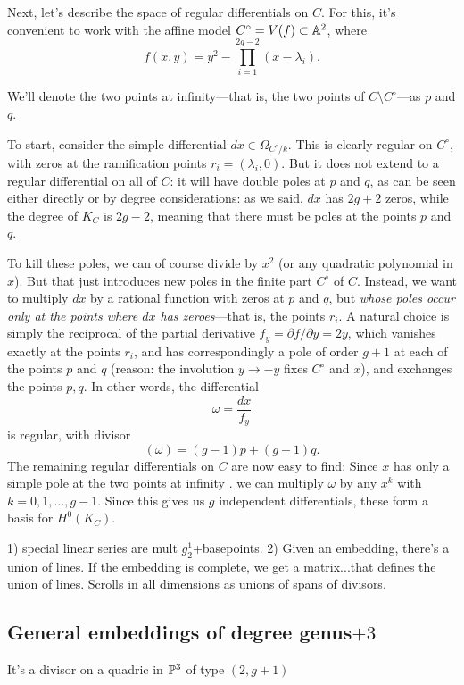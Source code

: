 Next, let's describe the space of regular differentials on $C$. For this, it's convenient to work with the affine model $C^\circ = V(f) \subset \AA^2$, where
$$
f(x,y) = y^2 - \prod_{i=1}^{2g-2} (x - \lambda_i).
$$

We'll denote the two points at infinity---that is, the two points of $C \setminus C^\circ$---as $p$ and $q$.

To start, consider the simple differential $dx\in \Omega_{C^\circ/k}$. This is clearly regular on $C^\circ$, with zeros at the ramification points $r_i = (\lambda_i, 0)$. But it does not extend to a regular differential on all of $C$: it will have double poles at $p$ and $q$, as can be seen either directly or by degree considerations: as we said, $dx$ has $2g+2$ zeros, while the degree of $K_C$ is $2g-2$, meaning that there must be poles at the points $p$ and $q$.

To kill these poles, we can of course divide by $x^2$ (or any quadratic polynomial in $x$). But that just introduces new poles in the finite part $C^\circ$ of $C$. Instead, we want to multiply $dx$ by a rational function with zeros at $p$ and $q$, but \emph{whose poles occur only at the points where $dx$ has zeroes}---that is, the points $r_i$.  A natural choice is simply the reciprocal of the partial derivative $f_y = \partial f/ \partial y = 2y$, which vanishes exactly at the points $r_i$, and has correspondingly a pole of order $g+1$ at each of the points $p$ and $q$ (reason: the involution $y\to -y$ fixes $C^\circ$ and $x$), and exchanges the points $p,q$. In other words, the differential
$$
\omega = \frac{dx}{f_y}
$$
is regular, with divisor
$$
(\omega) = (g-1)p + (g-1)q.
$$
The remaining regular differentials on $C$ are now easy to find: Since $x$ has only a simple pole
at the two points at infinity . we can  multiply $\omega$ by any $x^k$ with $k = 0, 1, \dots, g-1$. Since this gives us $g$ independent differentials, these  form a basis for $H^0(K_C)$.


 1) special linear series are mult $g^1_2$+basepoints. 2) Given an embedding, there's a union of lines. If the embedding is complete, we get a matrix...that defines the union of lines. Scrolls in all dimensions as unions of spans of divisors.
 
 
\subsection{General embeddings of degree
genus$+3$} 

It's a divisor on a quadric in $\PP^{3}$ of type $(2,g+1)$


